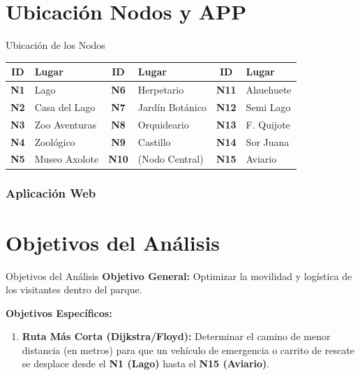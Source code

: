 \documentclass[aspectratio=169]{beamer}
\begin{document}
\section{Ubicación Nodos y APP}
\begin{frame}{Ubicación de los Nodos}
    \begin{table}[]
        \centering
        \small
        \begin{tabular}{cl|cl|cl}
            \toprule
            \textbf{ID} & \textbf{Lugar} & \textbf{ID} & \textbf{Lugar} & \textbf{ID} & \textbf{Lugar} \\
            \midrule
            \textbf{N1} & Lago & \textbf{N6} & Herpetario & \textbf{N11} & Ahuehuete \\
            \textbf{N2} & Casa del Lago & \textbf{N7} & Jardín Botánico & \textbf{N12} & Semi Lago \\
            \textbf{N3} & Zoo Aventuras & \textbf{N8} & Orquideario & \textbf{N13} & F. Quijote \\
            \textbf{N4} & Zoológico & \textbf{N9} & Castillo & \textbf{N14} & Sor Juana \\
            \textbf{N5} & Museo Axolote & \textbf{N10} & (Nodo Central) & \textbf{N15} & Aviario \\
            \bottomrule
        \end{tabular}
    \end{table}

    \frametitle{Aplicación Web}

    \begin{center}
        \href{https://enfrentamientoboochapultepec-jlwmnf4kxphwckqebymu5w.streamlit.app/}
        {}
    \end{center}
    
\end{frame}


\section{Objetivos del Análisis}
\begin{frame}{Objetivos del Análisis}
    \textbf{Objetivo General:}
    Optimizar la movilidad y logística de los visitantes dentro del parque.
    \vspace{0.5cm}
    
    \textbf{Objetivos Específicos:}
    \begin{enumerate}
        \item \textbf{Ruta Más Corta (Dijkstra/Floyd):} Determinar el camino de menor distancia (en metros) para que un vehículo de emergencia o carrito de rescate se desplace desde el \textbf{N1 (Lago)} hasta el \textbf{N15 (Aviario)}.
    \end{enumerate}
\end{frame}
\end{document}
